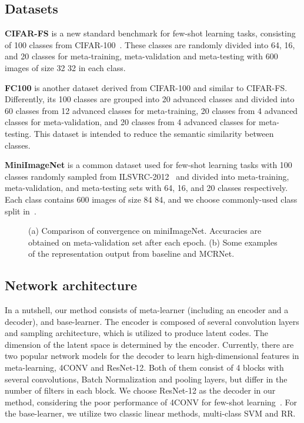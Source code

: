 \documentclass[10pt,conference,a4paper]{IEEEtran}
\begin{document}
\subsection{Datasets}
\textbf{CIFAR-FS} is a new standard benchmark for few-shot learning tasks, consisting of 100 classes from CIFAR-100~\cite{krizhevsky2010cifar}. These classes are randomly divided into 64, 16, and 20 classes for meta-training, meta-validation and meta-testing with 600 images of size 32  32 in each class.

\textbf{FC100} is another dataset derived from CIFAR-100 and similar to CIFAR-FS. Differently, its 100 classes are grouped into 20 advanced classes and divided into 60 classes from 12 advanced classes for meta-training, 20 classes from 4 advanced classes for meta-validation, and 20 classes from 4 advanced classes for meta-testing. This dataset is intended to reduce the semantic similarity between classes.

\textbf{MiniImageNet} is a common dataset used for few-shot learning tasks with 100 classes randomly sampled from ILSVRC-2012~\cite{russakovsky2015imagenet} and divided into meta-training, meta-validation, and meta-testing sets with 64, 16, and 20 classes respectively. Each class contains 600 images of size 84  84, and we choose commonly-used class split in~\cite{ravi2017optimization}.

\begin{figure*}[htbp]
	\centering
	\caption{(a) Comparison of convergence on miniImageNet. Accuracies are obtained on meta-validation set after each epoch. (b) Some examples of the representation output from baseline and MCRNet.}
	\label{convergence}
\end{figure*}

\subsection{Network architecture}
In a nutshell, our method consists of meta-learner (including an encoder and a decoder), and base-learner. The encoder is composed of several convolution layers and sampling architecture, which is utilized to produce latent codes. The dimension of the latent space is determined by the encoder. Currently, there are two popular network models for the decoder to learn high-dimensional features in meta-learning, 4CONV and ResNet-12. Both of them consist of 4 blocks with several convolutions, Batch Normalization and pooling layers, but differ in the number of filters in each block. We choose ResNet-12 as the decoder in our method, considering the poor performance of 4CONV for few-shot learning~\cite{Sun2019Meta}. For the base-learner, we utilize two classic linear methods, multi-class SVM and RR.
\end{document}
